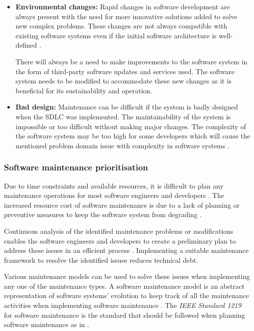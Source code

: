 \begin{itemize}
	\item \textbf{Environmental changes:} Rapid changes in software development are always present with the need for more innovative solutions added to solve new complex problems. These changes are not always compatible with existing software systems even if the initial software architecture is well-defined \cite{Ogheneovo2014}. \par There will always be a need to make improvements to the software system in the form of third-party software updates and services used. The software system needs to be modified to accommodate these new changes as it is beneficial for its sustainability and operation.
	\item \textbf{Bad design:} Maintenance can be difficult if the system is badly designed when the SDLC was implemented. The maintainability of the system is impossible or too difficult without making major changes. The complexity of the software system may be too high for some developers which will cause the mentioned problem domain issue with complexity in software systems \cite{Lenarduzzi2017}.
\end{itemize}

\clearpage

\subsubsection{Software maintenance prioritisation}\label{sec:ch1_maintenanceModel}
Due to time constraints and available resources, it is difficult to plan any maintenance operations for most software engineers and developers \cite{DeLeon-Sigg2020}. The increased resource cost of software maintenance is due to a lack of planning or preventive measures to keep the software system from degrading \cite{Alenezi2016}.\par Continuous analysis of the identified maintenance problems or modifications enables the software engineers and developers to create a preliminary plan to address these issues in an efficient process \cite{Port2017}. Implementing a suitable maintenance framework to resolve the identified issues reduces technical debt.\par Various maintenance models can be used to solve these issues when implementing any one of the maintenance types. A software maintenance model is an abstract representation of software systems' evolution to keep track of all the maintenance activities when implementing software maintenance \cite{Ren2011}. The \textit{IEEE Standard 1219} for software maintenance is the standard that should be followed when planning software maintenance as in . 

